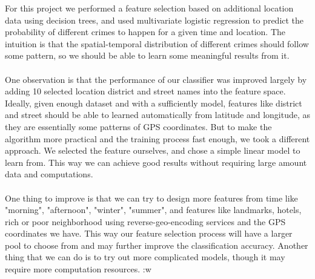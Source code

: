\documentclass[12pt]{article}
\newenvironment{p5}[2][Part VI Discussion and Future Work]{\begin{trivlist}
\item[\hskip \labelsep {\bfseries #1}\hskip \labelsep {\bfseries #2}]}{\end{trivlist}}
\newenvironment{p6}[2][References]{\begin{trivlist}
\item[\hskip \labelsep {\bfseries #1}\hskip \labelsep {\bfseries #2}]}{\end{trivlist}}
\begin{document}
\begin{p5}{}
\item{}
For this project we performed a feature selection based on additional location data using decision trees, and used multivariate logistic regression to predict the probability of different crimes to happen for a given time and location. The intuition is that the spatial-temporal distribution of different crimes should follow some pattern, so we should be able to learn some meaningful results from it.\\\\
One observation is that the performance of our classifier was improved largely by adding 10 selected location district and street names into the feature space. Ideally, given enough dataset and with a sufficiently model, features like district and street should be able to learned automatically from latitude and longitude, as they are essentially some patterns of GPS coordinates. But to make the algorithm more practical and the training process fast enough, we took a different approach. We selected the feature ourselves, and chose a simple linear model to learn from. This way we can achieve good results without requiring large amount data and computations.\\\\
One thing to improve is that we can try to design more features from time like "morning", "afternoon", "winter", "summer", and features like landmarks, hotels, rich or poor neighborhood using reverse-geo-encoding services and the GPS coordinates we have. This way our feature selection process will have a larger pool to choose from and may further improve the classification accuracy. Another thing that we can do is to try out more complicated models, though it may require more computation resources.
:w
\end{p5}{}

\begin{p6}{}
\end{p6}

 
\end{document}
